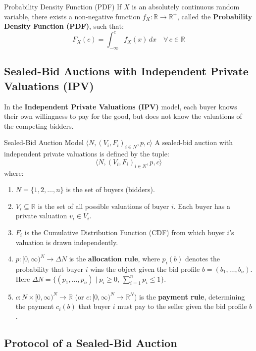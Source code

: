 \documentclass[12pt, a4paper]{article}
\begin{document}
\begin{defbox}{Probability Density Function (PDF)}
If $X$ is an absolutely continuous random variable, there exists a non-negative function $f_X : \mathbb{R} \to \mathbb{R}^+$, called the \textbf{Probability Density Function (PDF)}, such that:
\[
  F_X(c) = \int_{-\infty}^c f_X(x) \, dx \quad \forall\, c \in \mathbb{R}
\]
\end{defbox}

\subsection{Sealed-Bid Auctions with Independent Private Valuations (IPV)}

In the \textbf{Independent Private Valuations (IPV)} model, each buyer knows their own willingness to pay for the good, but does not know the valuations of the competing bidders.

\begin{defbox}{Sealed-Bid Auction Model $\langle N, (V_i, F_i)_{i \in N}, p, c \rangle$}
A sealed-bid auction with independent private valuations is defined by the tuple:
\[
  \langle N, (V_i, F_i)_{i \in N}, p, c \rangle
\]
where:
\begin{enumerate}
    \item $N = \{1, 2, \dots, n\}$ is the set of buyers (bidders).
    \item $V_i \subseteq \mathbb{R}$ is the set of all possible valuations of buyer $i$. Each buyer has a private valuation $v_i \in V_i$.
    \item $F_i$ is the Cumulative Distribution Function (CDF) from which buyer $i$'s valuation is drawn independently.
    \item $p : [0, \infty)^N \to \Delta N$ is the \textbf{allocation rule}, where $p_i(b)$ denotes the probability that buyer $i$ wins the object given the bid profile $b = (b_1, \dots, b_n)$. Here $\Delta N = \{ (p_1, \dots, p_n) \mid p_i \geq 0,\, \sum_{i=1}^n p_i \leq 1 \}$.
    \item $c : N \times [0, \infty)^N \to \mathbb{R}$ (or $c : [0, \infty)^N \to \mathbb{R}^N$) is the \textbf{payment rule}, determining the payment $c_i(b)$ that buyer $i$ must pay to the seller given the bid profile $b$.
\end{enumerate}
\end{defbox}

\subsection{Protocol of a Sealed-Bid Auction}
\end{document}
